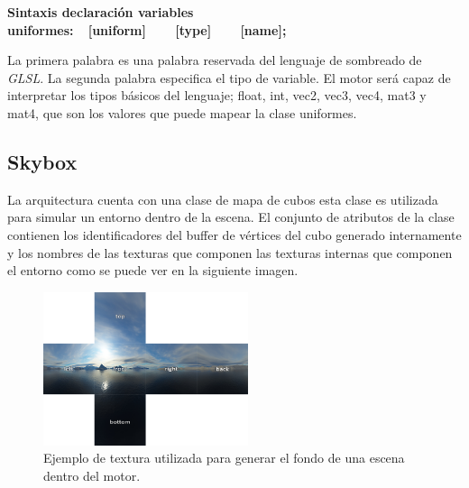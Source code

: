 \documentclass[a4paper]{book}
\begin{document}
\vspace{0.5cm}
\centerline{\textbf{Sintaxis declaración variables uniformes:\ \ [uniform]\ \ \ \ [type]\ \ \ \ [name];}}
\vspace{0.5cm}

La primera palabra es una palabra reservada del lenguaje de sombreado de \textit{GLSL}. La segunda palabra especifica el tipo de variable. El motor
será capaz de interpretar los tipos básicos del lenguaje; float, int, vec2, vec3, vec4, mat3 y mat4, que son los valores que puede mapear
la clase uniformes.

\subsection{Skybox}
\label{subsec:Skybox}

La arquitectura cuenta con una clase de mapa de cubos esta clase es utilizada para simular un entorno dentro de la escena. El conjunto de
atributos de la clase contienen los identificadores del buffer de vértices del cubo generado internamente y los nombres de las texturas
que componen las texturas internas que componen el entorno como se puede ver en la siguiente imagen.

\begin{figure}[H]
    \centering
    \includegraphics[width=6cm, keepaspectratio]{img/cubemaps_skybox.png}
    \caption{Ejemplo de textura utilizada para generar el fondo de una escena dentro del motor.}
    \label{cubemaps_skybox}
\end{figure}
\end{document}
